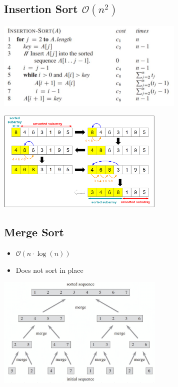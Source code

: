 \documentclass[10pt,a4paper,twocolumn]{article}
\newcommand\pro{\item[$+$]}
\newcommand\con{\item[$-$]}
\begin{document}
\subsection{Insertion Sort $\mathcal{O}(n^2)$}



\begin{center}
	\includegraphics[width=9cm]{images/insertion-sort}
\end{center}

\begin{center}
	\includegraphics[width=8cm]{images/insertion-sort-example}
\end{center}

\subsection{Merge Sort}
\begin{itemize}
	\pro $\mathcal{O}(n \cdot \log(n))$
	\con Does not sort in place
\end{itemize}

\begin{center}
	\includegraphics[width=8cm]{images/merge-sort}
\end{center}
\end{document}
